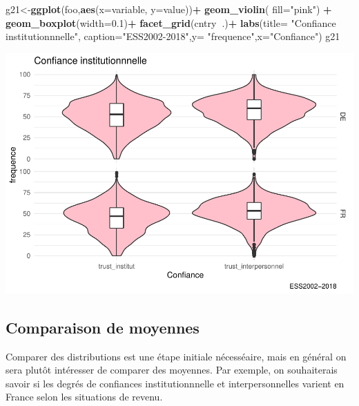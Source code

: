 \documentclass[
]{book}
\newenvironment{Shaded}{\begin{snugshade}}{\end{snugshade}}
\newcommand{\DataTypeTok}[1]{\textcolor[rgb]{0.13,0.29,0.53}{#1}}
\newcommand{\FloatTok}[1]{\textcolor[rgb]{0.00,0.00,0.81}{#1}}
\newcommand{\KeywordTok}[1]{\textcolor[rgb]{0.13,0.29,0.53}{\textbf{#1}}}
\newcommand{\NormalTok}[1]{#1}
\newcommand{\OperatorTok}[1]{\textcolor[rgb]{0.81,0.36,0.00}{\textbf{#1}}}
\newcommand{\StringTok}[1]{\textcolor[rgb]{0.31,0.60,0.02}{#1}}
\begin{document}
\begin{Shaded}
\begin{Highlighting}[]
\NormalTok{g21<-}\KeywordTok{ggplot}\NormalTok{(foo,}\KeywordTok{aes}\NormalTok{(}\DataTypeTok{x=}\NormalTok{variable, }\DataTypeTok{y=}\NormalTok{value))}\OperatorTok{+}\StringTok{ }
\StringTok{  }\KeywordTok{geom_violin}\NormalTok{( }\DataTypeTok{fill=}\StringTok{"pink"}\NormalTok{) }\OperatorTok{+}\StringTok{ }
\StringTok{  }\KeywordTok{geom_boxplot}\NormalTok{(}\DataTypeTok{width=}\FloatTok{0.1}\NormalTok{)}\OperatorTok{+}
\StringTok{  }\KeywordTok{facet_grid}\NormalTok{(cntry}\OperatorTok{~}\NormalTok{.)}\OperatorTok{+}\StringTok{   }
\StringTok{  }\KeywordTok{labs}\NormalTok{(}\DataTypeTok{title=} \StringTok{"Confiance institutionnnelle"}\NormalTok{, }\DataTypeTok{caption=}\StringTok{"ESS2002-2018"}\NormalTok{,}\DataTypeTok{y=} \StringTok{"frequence"}\NormalTok{,}\DataTypeTok{x=}\StringTok{"Confiance"}\NormalTok{)}
\NormalTok{g21}
\end{Highlighting}
\end{Shaded}

\includegraphics{bookdown-demo_files/figure-latex/418-2.pdf}

\hypertarget{comparaison-de-moyennes}{%
\subsection{Comparaison de moyennes}\label{comparaison-de-moyennes}}

Comparer des distributions est une étape initiale nécesséaire, mais en général on sera plutôt intéresser de comparer des moyennes. Par exemple, on souhaiterais savoir si les degrés de confiances institutionnnelle et interpersonnelles varient en France selon les situations de revenu.
\end{document}
